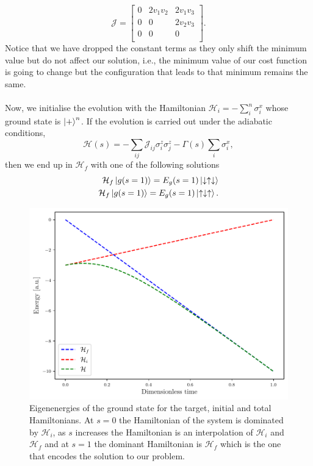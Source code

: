 \begin{equation}
\mathcal{J}= 
    \begin{bmatrix}
           0 & 2v_{1}v_{2} & 2v_{1}v_{3}\\
           0 & 0 & 2v_{2}v_{3}\\
           0& 0 & 0\\
         \end{bmatrix}.
\end{equation}
Notice that we have dropped the constant terms as they only shift the minimum value but do not affect our solution, i.e., the minimum value of our cost function is going to change but the configuration that leads to that minimum remains the same.\\\\
Now, we initialise the evolution with the Hamiltonian $\mathcal{H}_{i} = -\sum_{i}^{n}\sigma_{i}^{x}$ whose ground state is $\ket{+}^{n}$. 
If the evolution is carried out under the adiabatic conditions,
\begin{equation}
    \mathcal{H}(s) = -\sum_{ij}\mathcal{J}_{ij}\sigma_{i}^{z}\sigma_{j}^{z}  - \Gamma(s)\sum_{i}\sigma_{i}^{x},
\end{equation}
then we end up in $\mathcal{H}_{f}$ with one of the following solutions
\begin{align}
    \mathcal{H}_{f}\ket{g(s=1)} = E_{g}(s=1)\ket{\downarrow\uparrow\downarrow} \\
    \mathcal{H}_{f}\ket{g(s=1)} = E_{g}(s=1)\ket{\uparrow\downarrow\uparrow}.
\end{align}
\begin{figure}[H]
\centering
\includegraphics[width=\textwidth]{Figures/Two-Heirs.pdf}
    \caption{Eigenenergies of the ground state for the target, initial and total Hamiltonians. At $s=0$ the Hamiltonian of the system is dominated by $\mathcal{H}_{i}$, as $s$ increases the Hamiltonian is an interpolation of $\mathcal{H}_{i}$ and $\mathcal{H}_{f}$ and at $s=1$ the dominant Hamiltonian is $\mathcal{H}_{f}$ which is the one that encodes the solution to our problem.}
    \label{fig:HamiltonianInterpolation}
\end{figure}
